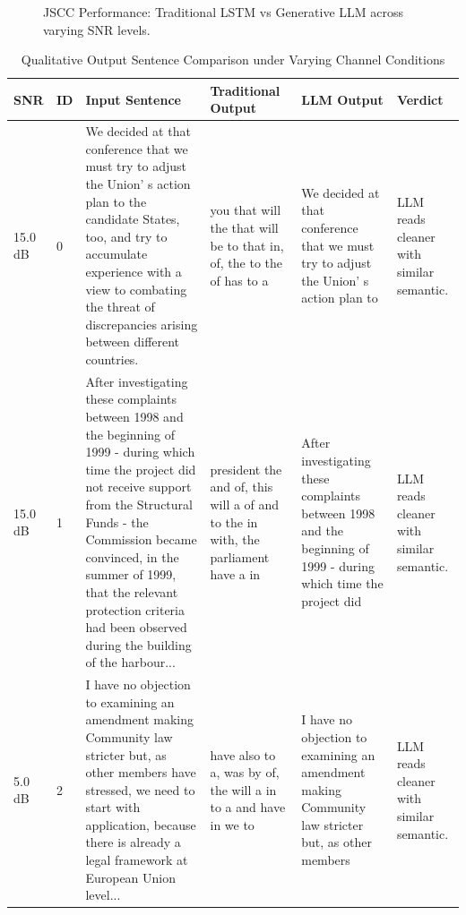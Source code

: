 \documentclass[twocolumn]{article}
\begin{document}
\begin{figure}[t]
\begin{minipage}{0.32\textwidth}
\end{minipage}
\caption{JSCC Performance: Traditional LSTM vs Generative LLM across varying SNR levels.}
\label{fig:jscc_performance_graphs}
\end{figure}

\begin{table}[t]
\centering
\caption{Qualitative Output Sentence Comparison under Varying Channel Conditions}
\label{tab:qualitative_comparison}
\renewcommand{\arraystretch}{1.4}
\begin{tabular}{p{0.8cm} p{0.3cm} p{4.2cm} p{3.2cm} p{4.2cm} p{2.5cm}}
\toprule
\textbf{SNR} & \textbf{ID} & \textbf{Input Sentence} & \textbf{Traditional Output} & \textbf{LLM Output} & \textbf{Verdict} \\
\midrule
15.0 dB & 0 & We decided at that conference that we must try to adjust the Union' s action plan to the candidate States, too, and try to accumulate experience with a view to combating the threat of discrepancies arising between different countries. & you that will the that will be to that in, of, the to the of has to a & We decided at that conference that we must try to adjust the Union' s action plan to & LLM reads cleaner with similar semantic. \\
15.0 dB & 1 & After investigating these complaints between 1998 and the beginning of 1999 - during which time the project did not receive support from the Structural Funds - the Commission became convinced, in the summer of 1999, that the relevant protection criteria had been observed during the building of the harbour... & president the and of, this will a of and to the in with, the parliament have a in & After investigating these complaints between 1998 and the beginning of 1999 - during which time the project did & LLM reads cleaner with similar semantic. \\
5.0 dB & 2 & I have no objection to examining an amendment making Community law stricter but, as other members have stressed, we need to start with application, because there is already a legal framework at European Union level... & have also to a, was by of, the will a in to a and have in we to & I have no objection to examining an amendment making Community law stricter but, as other members & LLM reads cleaner with similar semantic. \\

\end{tabular}
\end{table}
\end{document}
